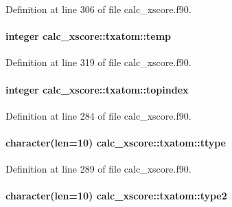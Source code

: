 Definition at line 306 of file calc\-\_\-xscore.\-f90.

\hypertarget{structcalc__xscore_1_1txatom_a0e4700b423c3a49a00fce1a6b1299102}{
\paragraph[{temp}]{\setlength{\rightskip}{0pt plus 5cm}integer calc\-\_\-xscore\-::txatom\-::temp}}\label{structcalc__xscore_1_1txatom_a0e4700b423c3a49a00fce1a6b1299102}


Definition at line 319 of file calc\-\_\-xscore.\-f90.

\hypertarget{structcalc__xscore_1_1txatom_ab558e47add04cd5b58f680d9a17ebb97}{
\paragraph[{topindex}]{\setlength{\rightskip}{0pt plus 5cm}integer calc\-\_\-xscore\-::txatom\-::topindex}}\label{structcalc__xscore_1_1txatom_ab558e47add04cd5b58f680d9a17ebb97}


Definition at line 284 of file calc\-\_\-xscore.\-f90.

\hypertarget{structcalc__xscore_1_1txatom_ad16524296088db4416e729609003a7f1}{
\paragraph[{ttype}]{\setlength{\rightskip}{0pt plus 5cm}character(len=10) calc\-\_\-xscore\-::txatom\-::ttype}}\label{structcalc__xscore_1_1txatom_ad16524296088db4416e729609003a7f1}


Definition at line 289 of file calc\-\_\-xscore.\-f90.

\hypertarget{structcalc__xscore_1_1txatom_ab4f28d56d2cd47dfafe28c61a2effbef}{
\paragraph[{type2}]{\setlength{\rightskip}{0pt plus 5cm}character(len=10) calc\-\_\-xscore\-::txatom\-::type2}}\label{structcalc__xscore_1_1txatom_ab4f28d56d2cd47dfafe28c61a2effbef}


